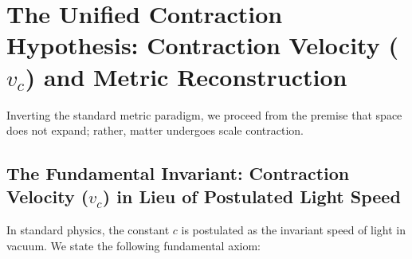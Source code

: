 \section{The Unified Contraction Hypothesis: Contraction Velocity (\texorpdfstring{$v_c$}{vc}) and Metric Reconstruction}
\label{sec:buzulme_metrikleri}

Inverting the standard metric paradigm, we proceed from the premise that space does not expand; rather, matter undergoes scale contraction.

\subsection{The Fundamental Invariant: Contraction Velocity (\texorpdfstring{$v_c$}{vc}) in Lieu of Postulated Light Speed}
In standard physics, the constant $c$ is postulated as the invariant speed of light in vacuum. We state the following fundamental axiom:

